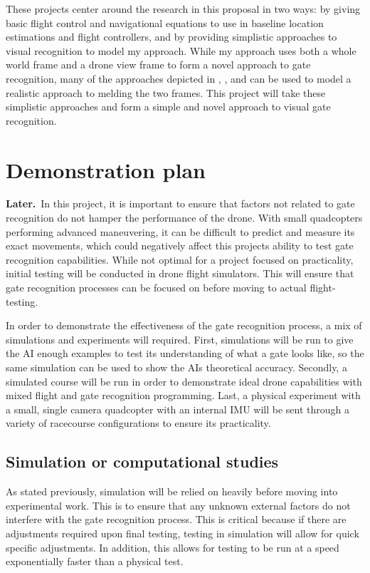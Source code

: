 \documentclass[onecolumn,10pt]{IEEEtran}
\newcommand{\Later}{\textbf{Later.}}
\begin{document}
These projects center around the research in this proposal in two ways: by giving basic flight control and navigational equations to use in baseline location estimations and flight controllers, and by providing simplistic approaches to visual recognition to model my approach. While my approach uses both a whole world frame and a drone view frame to form a novel approach to gate recognition, many of the approaches depicted in \cite{zhilenkov2018use}, \cite{jung2018perception}, and \cite{jung2018direct} can be used to model a realistic approach to melding the two frames. This project will take these simplistic approaches and form a simple and novel approach to visual gate recognition.






\section{Demonstration plan}
\Later\ In this project, it is important to ensure that factors not related to gate recognition do not hamper the performance of the drone. With small quadcopters performing advanced maneuvering, it can be difficult to predict and measure its exact movements, which could negatively affect this projects ability to test gate recognition capabilities. While not optimal for a project focused on practicality, initial testing will be conducted in drone flight simulators. This will ensure that gate recognition processes can be focused on before moving to actual flight-testing.

In order to demonstrate the effectiveness of the gate recognition process, a mix of simulations and experiments will required. First, simulations will be run to give the AI enough examples to test its understanding of what a gate looks like, so the same simulation can be used to show the AIs theoretical accuracy. Secondly, a simulated course will be run in order to demonstrate ideal drone capabilities with mixed flight and gate recognition programming. Last, a physical experiment with a small, single camera quadcopter with an internal IMU will be sent through a variety of racecourse configurations to ensure its practicality.


\subsection{Simulation or computational studies}
As stated previously, simulation will be relied on heavily before moving into experimental work. This is to ensure that any unknown external factors do not interfere with the gate recognition process. This is critical because if there are adjustments required upon final testing, testing in simulation will allow for quick specific adjustments. In addition, this allows for testing to be run at a speed exponentially faster than a physical test.
\end{document}
